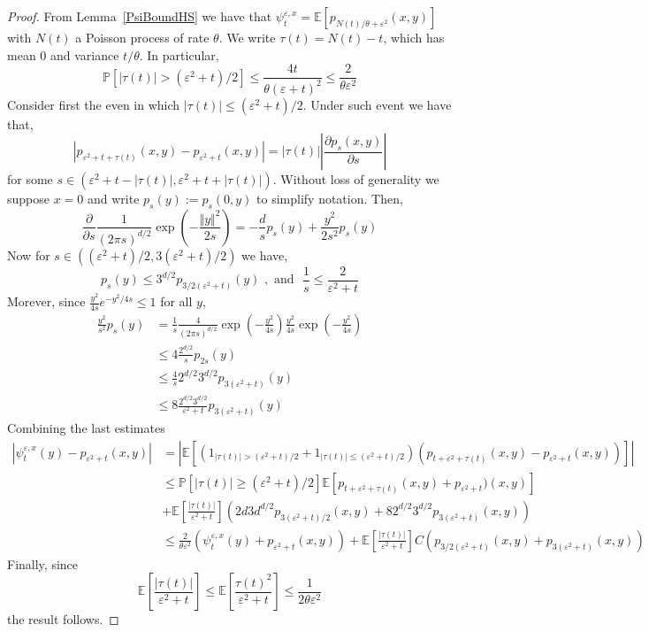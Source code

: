 \documentclass[a4paper,12pt]{article}
\newcommand{\EE}{\mathbb{E}}
\newcommand{\PP}{\mathbb{P}}
\newcommand{\1}{{\bf {1}}}
\def\epsilon{\varepsilon}
\begin{document}
\begin{proof}
From Lemma~\ref{PsiBoundHS} we have that $\psi_t^{\epsilon,x} = \EE\left[ p_{N(t)/\theta+\epsilon^2}(x,y) \right]$ with $N(t)$ a Poisson process of rate $\theta$. We write $\tau(t) = N(t)-t$, which has mean $0$ and variance $t/\theta$. In particular,
\begin{equation}
\PP[|\tau(t)| > (\epsilon^2+t)/2] \leq \frac{4t}{\theta(\epsilon+t)^2} \leq \frac{2}{\theta \epsilon^2} \label{eq:ConcentrationTau}
\end{equation}
Consider first the even in which $|\tau(t)| \leq (\epsilon^2+t)/2$. Under such event we have that,
\begin{equation} |p_{\epsilon^2+t+\tau(t)}(x,y) - p_{\epsilon^2+t}(x,y) | = |\tau(t)| \left| \frac{\partial p_s(x,y)}{\partial s} \right| \end{equation}
for some $s \in (\epsilon^2+t-|\tau(t)|, \epsilon^2+t+|\tau(t)|)$. Without loss of generality we suppose $x=0$ and write $p_s(y):=p_s(0,y)$ to simplify notation. Then,
\[ \frac{\partial}{\partial s} \frac{1}{(2 \pi s)^{d/2}} \exp(-\frac{\Vert y \Vert^2}{2s}) = - \frac{d}{s} p_s(y) + \frac{y^2}{2 s^2} p_s(y)\]
Now for $s \in ((\epsilon^2+t)/2,3(\epsilon^2+t)/2)$ we have,
\[ p_s(y) \leq 3^{d/2} p_{3/2(\epsilon^2+t)}(y) \, \, ,\text{ and } \, \, \frac{1}{s} \leq \frac{2}{\epsilon^2+t}\]
Morever, since $\frac{y^2}{4s} e^{-y^2/4s} \leq 1$ for all $y$,
\begin{align*}
\frac{y^2}{s^2}  p_s(y) &= \frac{1}{s} \frac{4}{(2 \pi s)^{d/2}}\exp(-\frac{y^2}{4s}) \frac{y^2}{4s} \exp( - \frac{y^2}{4 s}) \\ &\leq  4\frac{ 2^{d/2}}{s} p_{2s}(y) \\ &\leq \frac{4}{s}  2^{d/2} 3^{d/2} p_{3(\epsilon^2+t)}(y)  \\ & \leq 8 \frac{ 2^{d/2} 3^{d/2}}{\epsilon^2+t} p_{3(\epsilon^2+t)}(y)
\end{align*}
Combining the last estimates
\begin{align*}
|\psi_t^{\epsilon,x}(y)-p_{\epsilon^2+t}(x,y)| & = | \mathbb{E}\left[ (1_{|\tau(t)| > (\epsilon^2+t)/2}+1_{|\tau(t)| \leq (\epsilon^2+t)/2})(p_{t+\epsilon^2+\tau(t)}(x,y)-p_{\epsilon^2+t}(x,y)) \right]| \\ &\leq \PP[|\tau(t)| \geq (\epsilon^2+t)/2] \EE[p_{t+\epsilon^2+\tau(t)}(x,y) + p_{\epsilon^2+t})(x,y)] \\ &+ \mathbb{E}\left[ \frac{|\tau(t)|}{\epsilon^2+t}\right]\left( 2d3d^{d/2} p_{3(\epsilon^2+t)/2} (x,y) + 8 2^{d/2}3^{d/2} p_{3(\epsilon^2+t)}(x,y)\right) \\ & \leq \frac{2}{\theta \epsilon^2} (\psi_t^{\epsilon,x}(y)+p_{\epsilon^2+t}(x,y)) + \mathbb{E}\left[ \frac{|\tau(t)|}{\epsilon^2+t}\right] C (p_{3/2(\epsilon^2+t)}(x,y) + p_{3(\epsilon^2+t)}(x,y))
\end{align*}
Finally, since
\[ \mathbb{E}\left[ \frac{|\tau(t)|}{\epsilon^2+t}\right] \leq \mathbb{E}\left[ \frac{\tau(t)^2}{\epsilon^2+t}\right] \leq \frac{1}{2 \theta \epsilon^2} \]
the result follows.
\end{proof}
\end{document}
